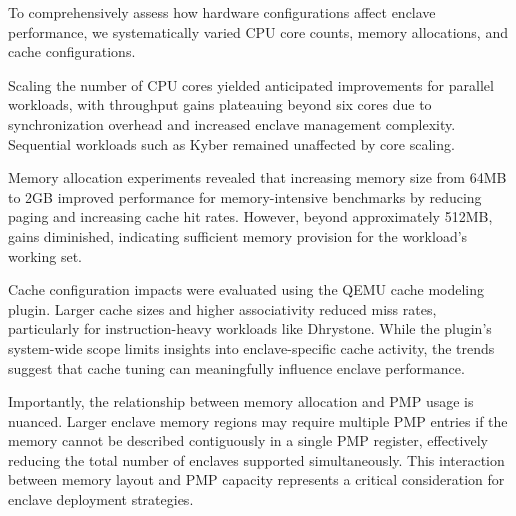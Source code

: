 To comprehensively assess how hardware configurations affect enclave performance, we systematically varied CPU core counts, memory allocations, and cache configurations.

Scaling the number of CPU cores yielded anticipated improvements for parallel workloads, with throughput gains plateauing beyond six cores due to synchronization overhead and increased enclave management complexity. Sequential workloads such as Kyber remained unaffected by core scaling.

Memory allocation experiments revealed that increasing memory size from 64MB to 2GB improved performance for memory-intensive benchmarks by reducing paging and increasing cache hit rates. However, beyond approximately 512MB, gains diminished, indicating sufficient memory provision for the workload’s working set.

Cache configuration impacts were evaluated using the QEMU cache modeling plugin. Larger cache sizes and higher associativity reduced miss rates, particularly for instruction-heavy workloads like Dhrystone. While the plugin’s system-wide scope limits insights into enclave-specific cache activity, the trends suggest that cache tuning can meaningfully influence enclave performance.

Importantly, the relationship between memory allocation and PMP usage is nuanced. Larger enclave memory regions may require multiple PMP entries if the memory cannot be described contiguously in a single PMP register, effectively reducing the total number of enclaves supported simultaneously. This interaction between memory layout and PMP capacity represents a critical consideration for enclave deployment strategies.
